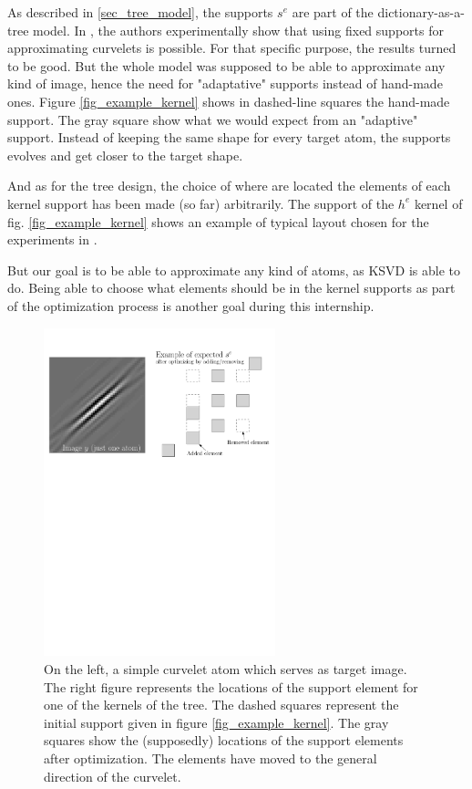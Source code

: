 As described in \ref{sec_tree_model}, the supports $s^e$ are part of the dictionary-as-a-tree model. In \cite{chabiron_toward_2015}, the authors experimentally show that using fixed supports for approximating curvelets is possible. For that specific purpose, the results turned to be good. But the whole model was supposed to be able to approximate any kind of image, hence the need for "adaptative" supports instead of hand-made ones. Figure \ref{fig_example_kernel} shows in dashed-line squares the hand-made support. The gray square show what we would expect from an "adaptive" support. Instead of keeping the same shape for every target atom, the supports evolves and get closer to the target shape.

And as for the tree design, the choice of where are located the elements of each kernel support has been made (so far) arbitrarily. The support of the $h^e$ kernel of fig. \ref{fig_example_kernel} shows an example of typical layout chosen for the experiments in \cite{chabiron_optimization_2016}. 

But our goal is to be able to approximate any kind of atoms, as \ac{KSVD} is able to do. Being able to choose what elements should be in the kernel supports as part of the optimization process is another goal during this internship.

\begin{figure}[!ht] \centering
\includegraphics[width=0.6\textwidth]{figures/add-rm-elmts-support.pdf}
\caption{On the left, a simple curvelet atom which serves as target image. The right figure represents the locations of the support element for one of the kernels of the tree. The dashed squares represent the initial support given in figure \ref{fig_example_kernel}. The gray squares show the (supposedly) locations of the support elements after optimization. The elements have moved to the general direction of the curvelet.\label{fig_example_optimal_support}}
\end{figure}


